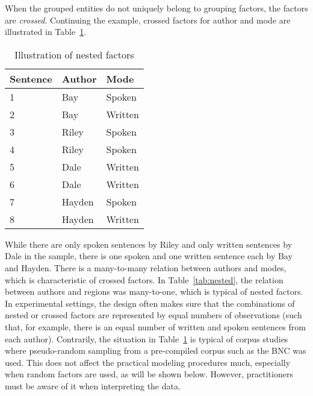 \documentclass[a4paper,12pt]{article}
\begin{document}
When the grouped entities do not uniquely belong to grouping factors, the factors are \textit{crossed}.
Continuing the example, crossed factors for author and mode are illustrated in Table~\ref{tab:crossed}.
%
\begin{table}
  \centering
  \begin{tabular}{lll}
    \toprule
    \textbf{Sentence} & \textbf{Author}  & \textbf{Mode}   \\
    \midrule
                    1 &           Bay    &         Spoken  \\
                    2 &           Bay    &         Written \\
                    3 &           Riley  &         Spoken  \\
                    4 &           Riley  &         Spoken  \\
                    5 &           Dale   &         Written \\
                    6 &           Dale   &         Written \\
                    7 &           Hayden &         Spoken  \\
                    8 &           Hayden &         Written \\
    \bottomrule
  \end{tabular}
  \caption{Illustration of nested factors}
  \label{tab:crossed}
\end{table}
%
While there are only spoken sentences by Riley and only written sentences by Dale in the sample, there is one spoken and one written sentence each by Bay and Hayden.
There is a many-to-many relation between authors and modes, which is characteristic of crossed factors.
In Table~\ref{tab:nested}, the relation between authors and regions was many-to-one, which is typical of nested factors.
In experimental settings, the design often makes sure that the combinations of nested or crossed factors are represented by equal numbers of observations (such that, for example, there is an equal number of written and spoken sentences from each author).
Contrarily, the situation in Table~\ref{tab:crossed} is typical of corpus studies where pseudo-random sampling from a pre-compiled corpus such as the BNC was used.
This does not affect the practical modeling procedures much, especially when random factors are used, as will be shown below.
However, practitioners must be aware of it when interpreting the data.
\end{document}
